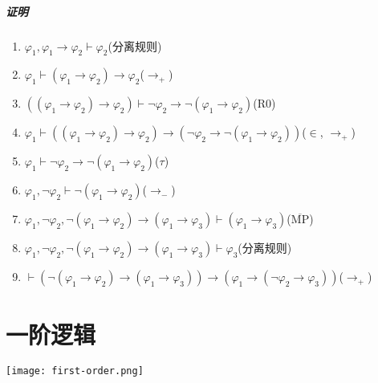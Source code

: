 \documentclass[b5paper,oneside]{ctexbook}
\begin{document}
\paragraph{证明}
\begin{enumerate}
\item $\varphi_1,\varphi_1\rightarrow\varphi_2\vdash\varphi_2$\hfill (分离规则)
\item $\varphi_1\vdash (\varphi_1\rightarrow\varphi_2)\rightarrow\varphi_2$\hfill ($\rightarrow_+$)
\item $((\varphi_1\rightarrow\varphi_2)\rightarrow\varphi_2)\vdash \neg\varphi_2\rightarrow\neg(\varphi_1\rightarrow\varphi_2 )$\hfill (R0)
\item $\varphi_1\vdash ((\varphi_1\rightarrow\varphi_2)\rightarrow\varphi_2)\rightarrow (\neg\varphi_2\rightarrow\neg(\varphi_1\rightarrow\varphi_2 ))$\hfill ($\in$, $\rightarrow_+$)
\item $\varphi_1\vdash\neg\varphi_2\rightarrow \neg(\varphi_1\rightarrow\varphi_2)$\hfill ($\tau$)
\item $\varphi_1,\neg\varphi_2\vdash\neg(\varphi_1\rightarrow\varphi_2)$\hfill ($\rightarrow_-$)
\item $\varphi_1,\neg\varphi_2,\neg(\varphi_1\rightarrow\varphi_2)\rightarrow(\varphi_1\rightarrow\varphi_3)\vdash (\varphi_1\rightarrow\varphi_3)$\hfill ($\overline{\mathrm{MP}}$)
\item $\varphi_1,\neg\varphi_2,\neg(\varphi_1\rightarrow\varphi_2)\rightarrow(\varphi_1\rightarrow\varphi_3)\vdash \varphi_3$\hfill (分离规则)
\item $\vdash(\neg (\varphi_1\rightarrow\varphi_2)\rightarrow (\varphi_1\rightarrow\varphi_3))\rightarrow (\varphi_1\rightarrow (\neg\varphi_2\rightarrow\varphi_3))$\hfill ($\rightarrow_+$)
\end{enumerate}
\chapter{一阶逻辑}
\vspace*{\fill}
\begin{center}
\texttt{[image: first-order.png]}
\end{center}
\vspace*{\fill}
\clearpage
\end{document}
